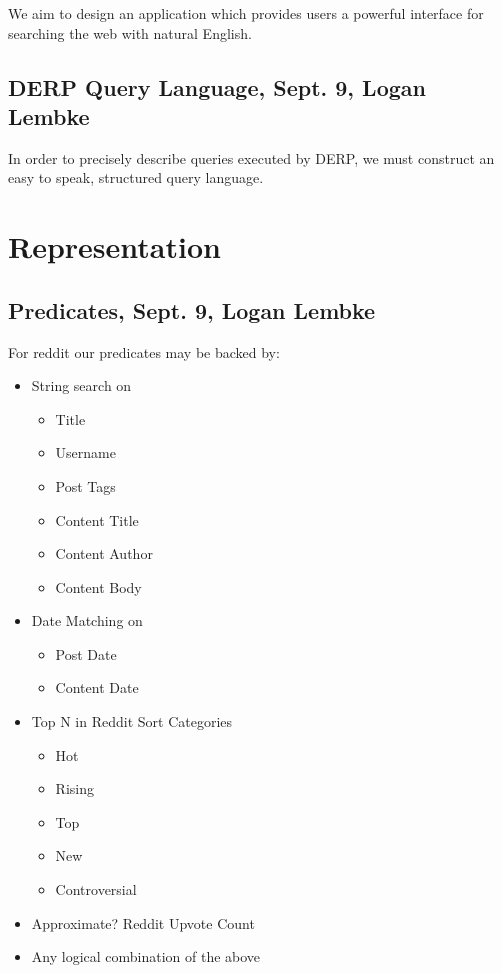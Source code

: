 \documentclass{article}
\begin{document}
We aim to design an application which provides users a powerful interface for searching the web with natural English. 

\subsection{DERP Query Language, Sept. 9, Logan Lembke}

In order to precisely describe queries executed by DERP, we must construct an easy to speak, structured query language. 


\section{Representation}
\subsection{Predicates, Sept. 9, Logan Lembke}
For reddit our predicates may be backed by:
\begin{itemize}
    \item String search on 
    \begin{itemize}
        \item Title
        \item Username
        \item Post Tags
        \item Content Title
        \item Content Author
        \item Content Body
    \end{itemize}
    \item Date Matching on
    \begin{itemize}
        \item Post Date
        \item Content Date
    \end{itemize}
    \item Top N in Reddit Sort Categories
    \begin{itemize}
        \item Hot
        \item Rising
        \item Top
        \item New
        \item Controversial
    \end{itemize}
    \item Approximate? Reddit Upvote Count
    \item Any logical combination of the above
\end{itemize}
\end{document}
